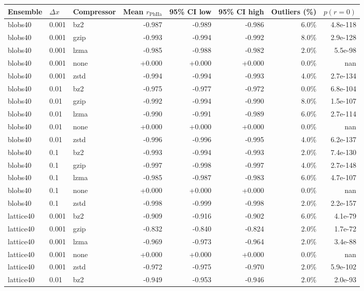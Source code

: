\begin{table}[h!]
\centering
\small
\begin{tabular}{l l l r r r r r}
\toprule
Ensemble & $\Delta x$ & Compressor & Mean $r_{\text{PhIIa}}$ & 95\% CI low & 95\% CI high & Outliers (\%) & $p(r=0)$\\
\midrule
blobs40 & 0.001 & bz2 & -0.987 & -0.989 & -0.986 & 6.0\% & 4.8e-118\\
blobs40 & 0.001 & gzip & -0.993 & -0.994 & -0.992 & 8.0\% & 2.9e-128\\
blobs40 & 0.001 & lzma & -0.985 & -0.988 & -0.982 & 2.0\% & 5.5e-98\\
blobs40 & 0.001 & none & +0.000 & +0.000 & +0.000 & 0.0\% & nan\\
blobs40 & 0.001 & zstd & -0.994 & -0.994 & -0.993 & 4.0\% & 2.7e-134\\
\midrule
blobs40 & 0.01 & bz2 & -0.975 & -0.977 & -0.972 & 0.0\% & 6.8e-104\\
blobs40 & 0.01 & gzip & -0.992 & -0.994 & -0.990 & 8.0\% & 1.5e-107\\
blobs40 & 0.01 & lzma & -0.990 & -0.991 & -0.989 & 6.0\% & 2.7e-114\\
blobs40 & 0.01 & none & +0.000 & +0.000 & +0.000 & 0.0\% & nan\\
blobs40 & 0.01 & zstd & -0.996 & -0.996 & -0.995 & 4.0\% & 6.2e-137\\
\midrule
blobs40 & 0.1 & bz2 & -0.993 & -0.994 & -0.993 & 2.0\% & 7.4e-130\\
blobs40 & 0.1 & gzip & -0.997 & -0.998 & -0.997 & 4.0\% & 2.7e-148\\
blobs40 & 0.1 & lzma & -0.985 & -0.987 & -0.983 & 6.0\% & 4.7e-107\\
blobs40 & 0.1 & none & +0.000 & +0.000 & +0.000 & 0.0\% & nan\\
blobs40 & 0.1 & zstd & -0.998 & -0.999 & -0.998 & 2.0\% & 2.2e-157\\
\midrule
lattice40 & 0.001 & bz2 & -0.909 & -0.916 & -0.902 & 6.0\% & 4.1e-79\\
lattice40 & 0.001 & gzip & -0.832 & -0.840 & -0.824 & 2.0\% & 1.7e-72\\
lattice40 & 0.001 & lzma & -0.969 & -0.973 & -0.964 & 2.0\% & 3.4e-88\\
lattice40 & 0.001 & none & +0.000 & +0.000 & +0.000 & 0.0\% & nan\\
lattice40 & 0.001 & zstd & -0.972 & -0.975 & -0.970 & 2.0\% & 5.9e-102\\
\midrule
lattice40 & 0.01 & bz2 & -0.949 & -0.953 & -0.946 & 2.0\% & 2.0e-93\\

\end{tabular}
\end{table}
